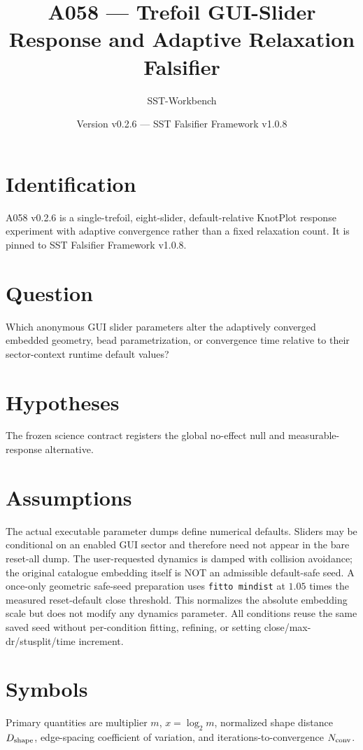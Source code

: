 \documentclass[11pt,a4paper]{article}
\begin{document}
\title{A058 --- Trefoil GUI-Slider Response and Adaptive Relaxation Falsifier}
\author{SST-Workbench}\date{Version v0.2.6 --- SST Falsifier Framework v1.0.8}\maketitle
{}
\section{Identification}
A058 v0.2.6 is a single-trefoil, eight-slider, default-relative KnotPlot response experiment with adaptive convergence rather than a fixed relaxation count. It is pinned to SST Falsifier Framework v1.0.8.
\section{Question}
Which anonymous GUI slider parameters alter the adaptively converged embedded geometry, bead parametrization, or convergence time relative to their sector-context runtime default values?
\section{Hypotheses}
The frozen science contract registers the global no-effect null and measurable-response alternative.
\section{Assumptions}
The actual executable parameter dumps define numerical defaults. Sliders may be conditional on an enabled GUI sector and therefore need not appear in the bare reset-all dump. The user-requested dynamics is damped with collision avoidance; the original catalogue embedding itself is NOT an admissible default-safe seed. A once-only geometric safe-seed preparation uses \texttt{fitto mindist} at $1.05$ times the measured reset-default close threshold. This normalizes the absolute embedding scale but does not modify any dynamics parameter. All conditions reuse the same saved seed without per-condition fitting, refining, or setting close/max-dr/stusplit/time increment.
\section{Symbols}
Primary quantities are multiplier $m$, $x=\log_2m$, normalized shape distance $D_{\rm shape}$, edge-spacing coefficient of variation, and iterations-to-convergence $N_{\rm conv}$.
\end{document}
